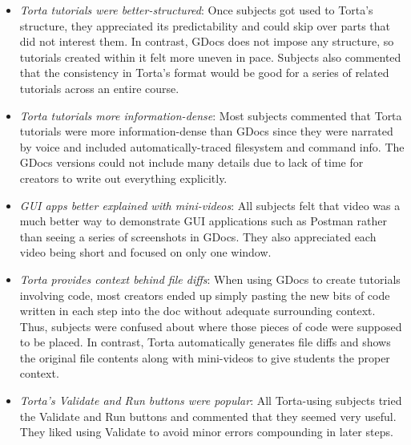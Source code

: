 \begin{itemize}\itemsep0pt

\item \emph{Torta tutorials were better-structured}: Once subjects got
used to Torta's structure, they appreciated its predictability and could
skip over parts that did not interest them. In contrast, GDocs does not
impose any structure, so tutorials created within it felt more uneven in
pace. Subjects also commented that the consistency in Torta's format
would be good for a series of related tutorials across an entire course.

\item \emph{Torta tutorials more information-dense}: Most subjects
commented that Torta tutorials were more information-dense than GDocs
since they were narrated by voice and included automatically-traced
filesystem and command info. The GDocs versions could not include many
details due to lack of time for creators to write out everything
explicitly.

\item \emph{GUI apps better explained with mini-videos}: All subjects
felt that video was a much better way to demonstrate GUI applications
such as Postman rather than seeing a series of screenshots in GDocs.
They also appreciated each video being short and focused on only one
window.

\item \emph{Torta provides context behind file diffs}: When using GDocs
to create tutorials involving code, most creators ended up simply
pasting the new bits of code written in each step into the doc without
adequate surrounding context. Thus, subjects were confused about where
those pieces of code were supposed to be placed. In contrast, Torta
automatically generates file diffs and shows the original file contents
along with mini-videos to give students the proper context.

\item \emph{Torta's Validate and Run buttons were popular}: All
Torta-using subjects tried the Validate and Run buttons and commented that they seemed very
useful. They liked using Validate to avoid minor errors
compounding in later steps.



\end{itemize}

